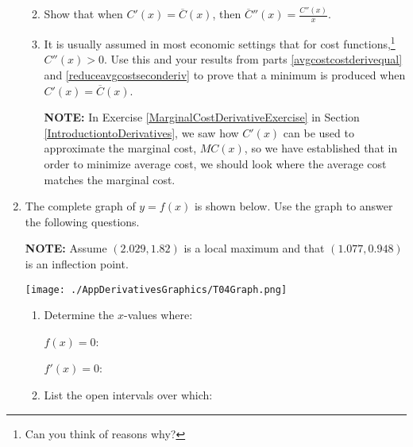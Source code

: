 \documentclass{ximera}
\begin{document}
\begin{enumerate}
\begin{enumerate}
\smallskip

\item\label{reduceavgcostseconderiv}  Show that when $C'(x) = \overline{C}(x)$, then $\overline{C}''(x)  = \frac{C''(x)}{x}$.

\smallskip

\item  It is usually assumed in most economic settings that for cost functions,\footnote{Can you think of reasons why?} $C''(x) > 0$.   Use this and your results from parts \ref{avgcostcostderivequal} and \ref{reduceavgcostseconderiv} to prove that a minimum is produced  when $C'(x) = \overline{C}(x)$.  

\smallskip

\textbf{NOTE:} In Exercise \ref{MarginalCostDerivativeExercise} in Section \ref{IntroductiontoDerivatives}, we saw how $C'(x)$ can be used to approximate the marginal cost, $MC(x)$, so we have established that in order to minimize average cost, we should look where the average cost matches the marginal cost.


\end{enumerate}

\item  The complete graph of $y = f(x)$ is shown below. Use the graph to answer the following questions.

\smallskip


\textbf{NOTE:} Assume $(2.029, 1.82)$ is a local maximum and that $(1.077, 0.948)$ is an inflection point.


\smallskip

\centerline{\texttt{[image: ./AppDerivativesGraphics/T04Graph.png]}}

\smallskip

\begin{enumerate}

\item  Determine the $x$-values where:

\begin{multicols}{2}

 $f(x) = 0$:
 
  $f'(x) = 0$:

\end{multicols}

\smallskip

\item List the open intervals over which:

\begin{multicols}{2}


\end{multicols}
\end{enumerate}
\end{enumerate}
\end{document}
